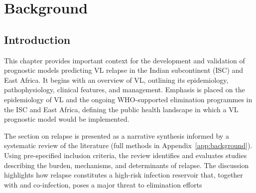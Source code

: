 \chapter{\label{ch:1-background}Background}
\minitoc

\section{Introduction}


This chapter provides important context for the development and validation of prognostic models predicting VL relapse in the Indian subcontinent (ISC) and East Africa. It begins with an overview of VL, outlining its epidemiology, pathophysiology, clinical features, and management. Emphasis is placed on the epidemiology of VL and the ongoing WHO-supported elimination programmes in the ISC and East Africa, defining the public health landscape in which a VL prognostic model would be implemented.

The section on relapse is presented as a narrative synthesis informed by a systematic review of the literature (full methods in Appendix~\ref{app:background}). Using pre-specified inclusion criteria, the review identifies and evaluates studies describing the burden, mechanisms, and determinants of relapse. The discussion highlights how relapse constitutes a high-risk infection reservoir that, together with  and  co-infection, poses a major threat to elimination efforts \textemdash\ 

